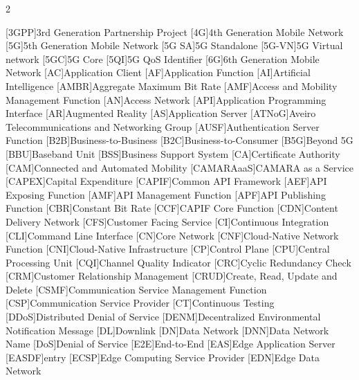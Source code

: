 \begin{multicols}{2}
\begin{acronym}[AAAAAAAAA]
	[3GPP]{3rd Generation Partnership Project}
	[4G]{4th Generation Mobile Network}
	[5G]{5th Generation Mobile Network}
	[5G SA]{\acs{5G} Standalone} 
	[5G-VN]{\acs{5G} Virtual network}
	[5GC]{5G Core}
	[5QI]{\acs{5G} \acs{QoS} Identifier}
	[6G]{6th Generation Mobile Network}
	[AC]{Application Client}
	[AF]{Application Function}
	[AI]{Artificial Intelligence}
    [AMBR]{Aggregate Maximum Bit Rate}
	[AMF]{Access and Mobility Management Function}
    [AN]{Access Network}
	[API]{Application Programming Interface}
	[AR]{Augmented Reality}
	[AS]{Application Server}
	[ATNoG]{Aveiro Telecommunications and Networking Group}
	[AUSF]{Authentication Server Function}
	[B2B]{Business-to-Business}
	[B2C]{Business-to-Consumer}
	[B5G]{Beyond 5G}
	[BBU]{Baseband Unit}
	[BSS]{Business Support System}
    [CA]{Certificate Authority}
	[CAM]{Connected and Automated Mobility} 
	[CAMARAaaS]{CAMARA as a Service}
	[CAPEX]{Capital Expenditure}
	[CAPIF]{Common API Framework}
	[AEF]{API Exposing Function}
	[AMF]{API Management Function}
	[APF]{API Publishing Function}
	[CBR]{Constant Bit Rate}
	[CCF]{CAPIF Core Function}
	[CDN]{Content Delivery Network}
	[CFS]{Customer Facing Service}
	[CI]{Continuous Integration}
	[CLI]{Command Line Interface}
	[CN]{Core Network}
	[CNF]{Cloud-Native Network Function}
	[CNI]{Cloud-Native Infrastructure}
	[CP]{Control Plane}
	[CPU]{Central Processing Unit}
	[CQI]{Channel Quality Indicator}
	[CRC]{Cyclic Redundancy Check}
	[CRM]{Customer Relationship Management}
	[CRUD]{Create, Read, Update and Delete}
    [CSMF]{Communication Service Management Function}
	[CSP]{Communication Service Provider}
	[CT]{Continuous Testing}
	[DDoS]{Distributed Denial of Service}
    [DENM]{Decentralized Environmental Notification Message}
	[DL]{Downlink}
	[DN]{Data Network}
	[DNN]{Data Network Name}
	[DoS]{Denial of Service}
	[E2E]{End-to-End}
	[EAS]{Edge Application Server}
	[EASDF]{entry}
	[ECSP]{Edge Computing Service Provider}
	[EDN]{Edge Data Network}

\end{acronym}
\end{multicols}
